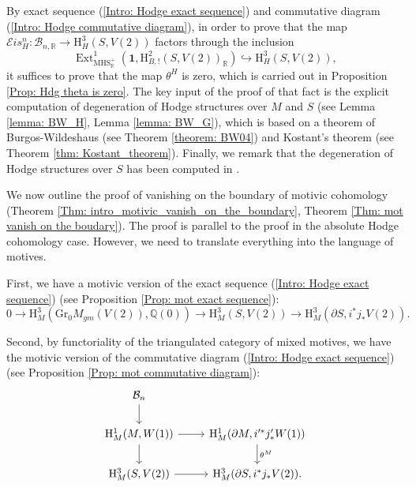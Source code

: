 \documentclass[11pt, a4paper]{amsart}
\theoremstyle{plain}
\theoremstyle{definition}
\numberwithin{equation}{section}
\def\QQ{\mathbb{Q}}
\def\RR{\mathbb{R}}
\DeclareMathOperator{\Ext}{Ext}
\begin{document}
By exact sequence (\ref{Intro: Hodge exact sequence}) and commutative diagram (\ref{Intro: Hodge commutative diagram}), in order to prove that the map $\mathcal{E}is_{H}^n \colon \mathcal{B}_{n,\RR} \rightarrow \mathrm{H}^{3}_{H}(S, V(2))$ factors through the inclusion 
\[
    \Ext^{1}_{\mathrm{MHS}_{\RR}^{+}}(\mathbf{1}, \mathrm{H}^{2}_{B,!}(S, V(2))_{\RR}) \hookrightarrow \mathrm{H}^{3}_{H}(S, V(2)), 
\]
it suffices to prove that the map $\theta^{H}$ is zero, which is carried out in Proposition \ref{Prop: Hdg theta is zero}. The key input of the proof of that fact is the explicit computation of degeneration of Hodge structures over $M$ and $S$ (see Lemma \ref{lemma: BW_H}, Lemma \ref{lemma: BW_G}), which is based on a theorem of Burgos-Wildeshaus (see Theorem \ref{theorem: BW04}) and Kostant's theorem (see Theorem \ref{thm: Kostant_theorem}). Finally, we remark that the degeneration of Hodge structures over $S$ has been computed in \cite{Anc17}. \\


\par We now outline the proof of vanishing on the boundary of motivic cohomology (Theorem \ref{Thm: intro_motivic_vanish_on_the_boundary}, Theorem \ref{Thm: mot vanish on the boudary}). The proof is parallel to the proof in the absolute Hodge cohomology case. However, we need to translate everything into the language of motives. 

\par First, we have a motivic version of the exact sequence (\ref{Intro: Hodge exact sequence}) (see Proposition \ref{Prop: mot exact sequence}): 
\begin{equation}
\label{Intro: Mot exact sequence}
    0 \rightarrow   \mathrm{H}_{M}^{3}(\mathrm{Gr_{0}}M_{gm}(V(2)), \QQ(0)) \rightarrow \mathrm{H}^{3}_{M}(S,V(2)) \rightarrow \mathrm{H}^{3}_{M}(\partial{S}, i^{*}j_{*}V(2)).
\end{equation}

\par Second, by functoriality of the triangulated category of mixed motives, we have the motivic version of the commutative diagram (\ref{Intro: Hodge exact sequence}) (see Proposition \ref{Prop: mot commutative diagram}): 
\begin{equation}
\label{Intro: Mot commutative diagram}
    \begin{tikzcd}
        \mathcal{B}_n \ar[d] & \\
        \mathrm{H}^{1}_{M}(M,W(1)) \ar[r] \ar[d] & \mathrm{H}^{1}_{M}(\partial{M}, i^{\prime*}j^{\prime}_{*}W(1)) \ar[d, "\theta^{M}"] \\
        \mathrm{H}^{3}_{M}(S, V(2)) \ar[r] & \mathrm{H}^{3}_{M}(\partial{S}, i^{*}j_{*}V(2)). 
    \end{tikzcd}
\end{equation}
\end{document}

